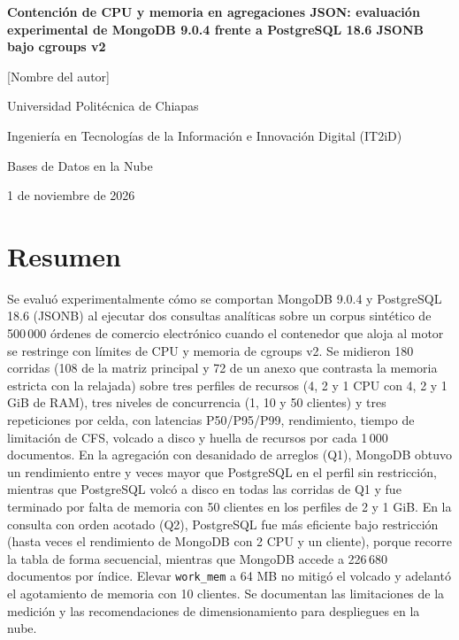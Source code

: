\documentclass[12pt,letterpaper]{article}
\newcommand{\autor}{[Nombre del autor]}
\newcommand{\docente}{[Nombre del docente]}
\newcommand{\fechaentrega}{1 de noviembre de 2026}
\newcommand{\institucion}{Universidad Politécnica de Chiapas}
\newcommand{\programa}{Ingeniería en Tecnologías de la Información e Innovación Digital (IT2iD)}
\newcommand{\curso}{Bases de Datos en la Nube}
\newcommand{\titulo}{Contención de CPU y memoria en agregaciones JSON: evaluación experimental de MongoDB 9.0.4 frente a PostgreSQL 18.6 JSONB bajo cgroups v2}
\newcommand{\code}[1]{\texttt{#1}}
\begin{document}
\doublespacing

\thispagestyle{fancy}
\begin{center}
\vspace*{1.2in}
{\bfseries \titulo\par}
\vspace{1\baselineskip}
\autor\par
\institucion\par
\programa\par
\curso\par
\docente\par
\fechaentrega\par
\end{center}
\clearpage

\section{Resumen}
\noindent
Se evaluó experimentalmente cómo se comportan MongoDB 9.0.4 y PostgreSQL 18.6 (JSONB) al ejecutar dos
consultas analíticas sobre un corpus sintético de 500\,000 órdenes de comercio electrónico cuando el
contenedor que aloja al motor se restringe con límites de CPU y memoria de cgroups v2. Se midieron 180 corridas
(108 de la matriz principal y 72 de un anexo que contrasta la memoria estricta con la relajada) sobre tres
perfiles de recursos (4, 2 y 1 CPU con 4, 2 y 1 GiB de RAM), tres niveles de concurrencia (1, 10 y 50 clientes) y tres
repeticiones por celda, con latencias P50/P95/P99, rendimiento, tiempo de limitación de CFS, volcado a disco y
huella de recursos por cada 1\,000 documentos. En la agregación con desanidado de arreglos (Q1),
MongoDB obtuvo un rendimiento entre  y  veces mayor que PostgreSQL en el
perfil sin restricción, mientras que PostgreSQL volcó a disco en todas las corridas de Q1 y fue terminado por falta de memoria
con 50 clientes en los perfiles de 2 y 1 GiB. En la consulta con orden acotado (Q2), PostgreSQL fue
más eficiente bajo restricción (hasta  veces el rendimiento de MongoDB con 2 CPU y un cliente), porque
recorre la tabla de forma secuencial, mientras que MongoDB accede a 226\,680 documentos por índice. Elevar \code{work\_mem} a 64 MB
no mitigó el volcado y adelantó el agotamiento de memoria con 10 clientes. Se documentan las limitaciones de la
medición y las recomendaciones de dimensionamiento para despliegues en la nube.
\end{document}
